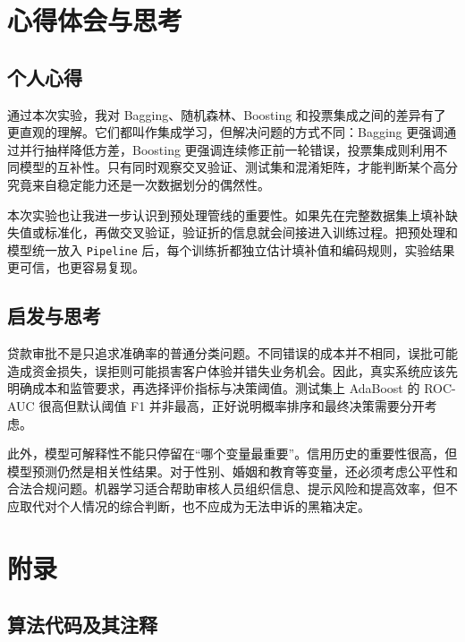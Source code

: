 \documentclass[UTF8,a4paper,12pt]{ctexart}
\begin{document}
\section{心得体会与思考}

\subsection{个人心得}

通过本次实验，我对 Bagging、随机森林、Boosting 和投票集成之间的差异有了更直观的理解。它们都叫作集成学习，但解决问题的方式不同：Bagging 更强调通过并行抽样降低方差，Boosting 更强调连续修正前一轮错误，投票集成则利用不同模型的互补性。只有同时观察交叉验证、测试集和混淆矩阵，才能判断某个高分究竟来自稳定能力还是一次数据划分的偶然性。

本次实验也让我进一步认识到预处理管线的重要性。如果先在完整数据集上填补缺失值或标准化，再做交叉验证，验证折的信息就会间接进入训练过程。把预处理和模型统一放入 \texttt{Pipeline} 后，每个训练折都独立估计填补值和编码规则，实验结果更可信，也更容易复现。

\subsection{启发与思考}

贷款审批不是只追求准确率的普通分类问题。不同错误的成本并不相同，误批可能造成资金损失，误拒则可能损害客户体验并错失业务机会。因此，真实系统应该先明确成本和监管要求，再选择评价指标与决策阈值。测试集上 AdaBoost 的 ROC-AUC 很高但默认阈值 F1 并非最高，正好说明概率排序和最终决策需要分开考虑。

此外，模型可解释性不能只停留在“哪个变量最重要”。信用历史的重要性很高，但模型预测仍然是相关性结果。对于性别、婚姻和教育等变量，还必须考虑公平性和合法合规问题。机器学习适合帮助审核人员组织信息、提示风险和提高效率，但不应取代对个人情况的综合判断，也不应成为无法申诉的黑箱决定。

\clearpage
\section{附录}

\subsection*{算法代码及其注释}

\end{document}
